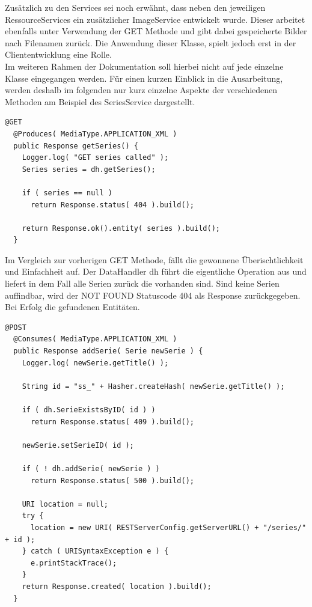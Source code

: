 Zusätzlich zu den Services sei noch erwähnt, dass neben den jeweiligen RessourceServices ein zusätzlicher ImageService entwickelt wurde. Dieser arbeitet ebenfalls unter Verwendung der GET Methode und gibt dabei gespeicherte Bilder nach Filenamen zurück. Die Anwendung dieser Klasse, spielt jedoch erst in der Cliententwicklung eine Rolle.\\
\newpage
Im weiteren Rahmen der Dokumentation soll hierbei nicht auf jede einzelne Klasse eingegangen werden. Für einen kurzen Einblick in die Ausarbeitung, werden deshalb im folgenden nur kurz einzelne Aspekte der verschiedenen Methoden am Beispiel des SeriesService dargestellt.
\begin{lstlisting}[label=seriesservice,caption= GET Methode /series ]
  @GET
  @Produces( MediaType.APPLICATION_XML )
  public Response getSeries() {
    Logger.log( "GET series called" );
    Series series = dh.getSeries();

    if ( series == null )
      return Response.status( 404 ).build();

    return Response.ok().entity( series ).build();
  }
\end{lstlisting}
Im Vergleich zur vorherigen GET Methode, fällt die gewonnene Überischtlichkeit und Einfachheit auf. Der DataHandler dh führt die eigentliche Operation aus und liefert in dem Fall alle Serien zurück die vorhanden sind. Sind keine Serien auffindbar, wird der NOT FOUND Statuscode 404 als Response zurückgegeben. Bei Erfolg die gefundenen Entitäten.
\begin{lstlisting}[label=seriesservice,caption= POST Methode /series ]
@POST
  @Consumes( MediaType.APPLICATION_XML )
  public Response addSerie( Serie newSerie ) {
    Logger.log( newSerie.getTitle() );
   
    String id = "ss_" + Hasher.createHash( newSerie.getTitle() );

    if ( dh.SerieExistsByID( id ) )
      return Response.status( 409 ).build();

    newSerie.setSerieID( id );

    if ( ! dh.addSerie( newSerie ) )
      return Response.status( 500 ).build();

    URI location = null;
    try {
      location = new URI( RESTServerConfig.getServerURL() + "/series/" + id );
    } catch ( URISyntaxException e ) {
      e.printStackTrace();
    }
    return Response.created( location ).build();
  }
\end{lstlisting}

